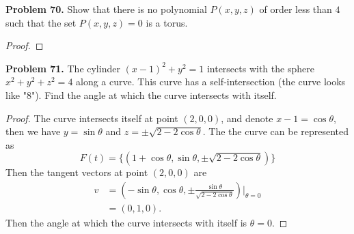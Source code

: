 \documentclass[12pt,leqno]{amsart}
\theoremstyle{definition}
\begin{document}
\medskip

\noindent
{\bf Problem 70.}
Show that there is no polynomial $P(x,y,z)$ of order less than $4$ such
that the set $P(x,y,z)=0$ is a torus.
\begin{proof}

\end{proof}

\medskip


\noindent
{\bf Problem 71.}
The cylinder $(x-1)^2+y^2 = 1$ intersects with the sphere $x^2+y^2+z^2=4$ along a curve. This curve has a self-intersection (the curve looks like "8"). Find the angle at which the curve intersects with itself.
\begin{proof}
The curve intersects itself at point $(2,0,0)$, and denote $x - 1 = \cos \theta$, then we have $y = \sin \theta$ and $z = \pm \sqrt{2 - 2\cos \theta}$. The the curve can be represented as 
$$F(t) = \{(1+\cos \theta, \sin \theta, \pm \sqrt{2 - 2\cos \theta} )\}$$
Then the tangent vectors at point $(2,0,0)$ are 
\begin{align*}
    v & = \left(-\sin \theta, \cos \theta, \pm \frac{\sin \theta}{\sqrt{2 - 2\cos \theta}}\right)\Bigg|_{\theta = 0} \\
    & = \left(0, 1, 0\right).
\end{align*}
Then the angle at which the curve intersects with itself is $\theta = 0$.
\end{proof}
\end{document}
